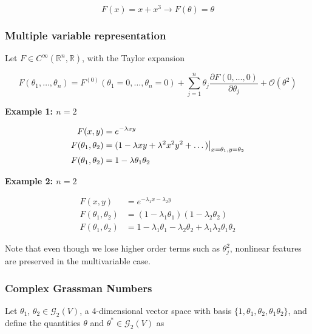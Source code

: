 \begin{equation}
F(x) = x + x^3 \rightarrow F(\theta) = \theta
\end{equation}

\subsubsection*{Multiple variable representation}

\noindent Let $F \in C^\infty (\mathbb{R}^n, \mathbb{R})$, with the Taylor expansion

\begin{equation}
F(\theta_1, \dots , \theta_n) = F^{(0)} (\theta_1=0, \dots , \theta_n=0) + \sum_{j=1}^n \theta_j \frac{\partial F(0, \dots , 0)}{\partial \theta_j} + \mathcal{O}(\theta^2)
\end{equation}

\textbf{Example 1: $n=2$}

\begin{align}
F(x,y) &= e^{-\lambda x y} \\
F(\theta_1, \theta_2) &= (1 - \lambda x y + \lambda^2 x^2 y^2 + \dots ) \big{|}_{x=\theta_1, y=\theta_2} \\
F(\theta_1, \theta_2) &= 1 - \lambda \theta_1 \theta_2
\end{align}

\textbf{Example 2: $n=2$}

\begin{align}
F(x,y) &= e^{-\lambda_1 x - \lambda_2 y} \\
F(\theta_1, \theta_2) &= (1 - \lambda_1 \theta_1 ) ( 1 - \lambda_2 \theta_2) \\
F(\theta_1, \theta_2) &= 1 - \lambda_1 \theta_1 - \lambda_2 \theta_2 + \lambda_1 \lambda_2 \theta_1 \theta_2
\end{align}

\noindent Note that even though we lose higher order terms such as $\theta_j^2$, nonlinear features are preserved in the multivariable case.

\subsubsection*{Complex Grassman Numbers}

\noindent Let $\theta_1$, $\theta_2 \in \mathcal{G}_2 (V)$, a 4-dimensional vector space with basis $\{1, \theta_1, \theta_2, \theta_1 \theta_2 \}$, and define the quantities $\theta$ and $\theta^* \in \mathcal{G}_2 (V)$ as

